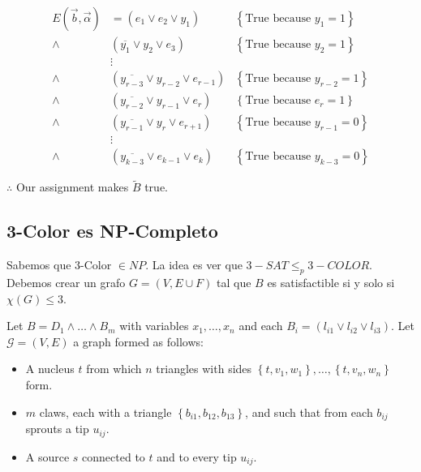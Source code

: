 \begin{align*}
    E(\overrightarrow{b}, \overrightarrow{\alpha}) &= \left( e_1 \lor e_2 \lor y_1 \right) &\left\{ \text{True because } y_1 = 1 \right\}  \\ 
    \land &\left( \overline{y_1} \lor  y_2 \lor  e_3 \right) &\left\{ \text{True because } y_2 = 1 \right\}  \\ 
          &\vdots& \\ 
    \land &(\overline{y_{r-3}} \lor  y_{r-2} \lor  e_{r-1}) &\left\{ \text{True because } y_{r-2} = 1 \right\}  \\ 
    \land&(\overline{y_{r-2}} \lor  y_{r-1} \lor  e_r) &\left\{ \text{True because } e_{r} = 1 \right\}  \\ 
    \land&(\overline{y_{r-1}} \lor y_{r} \lor  e_{r+1}) &\left\{ \text{True because } y_{r-1} = 0 \right\}  \\ 
         &\vdots &\\ 
    \land &(\overline{y_{k-3}} \lor e_{k-1} \lor  e_k) &\left\{ \text{True because } y_{k-3} = 0 \right\} 
\end{align*}

$\therefore $ Our assignment makes $\tilde{ B }$ true.

\pagebreak 


\subsection{3-Color es NP-Completo}

Sabemos que $3$-Color $\in NP$. La idea es ver que $3-SAT \leq_p 3-COLOR$. 
Debemos crear un grafo $G = (V, E \cup F) $ tal que $B$ es satisfactible 
si y solo si $\chi(G) \leq 3$.

Let $B = D_1 \land  \ldots \land  B_m$ with variables $x_1, \ldots, x_n$ and each $B_i
= (l_{i1} \lor l_{i2} \lor  l_{i3})$. Let $\mathcal{G} = (V, E)$ a graph 
formed as follows: 

\begin{itemize}
    \item A nucleus $t$ from which $n$ triangles with sides $\left\{ t, v_1, w_1 \right\}, \ldots, \left\{ t, v_n, w_n \right\}  $ form.
    \item $m$ claws, each with a triangle $\left\{ b_{i1}, b_{12}, b_{13} \right\} $, and such that from each $b_{ij}$ sprouts a tip $u_{ij}$.
    \item A source $s$ connected to $t$ and to every tip $u_{ij}$.
\end{itemize}

